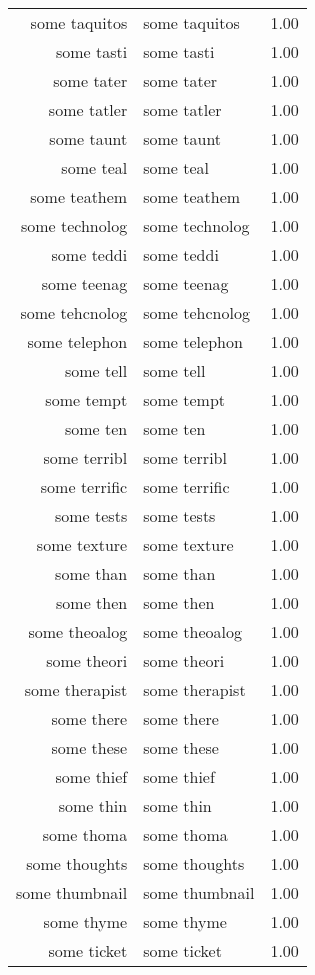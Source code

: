\begin{table}[ht]
\begin{tabular}{rlr}
  some taquitos & some taquitos & 1.00 \\ 
  some tasti & some tasti & 1.00 \\ 
  some tater & some tater & 1.00 \\ 
  some tatler & some tatler & 1.00 \\ 
  some taunt & some taunt & 1.00 \\ 
  some teal & some teal & 1.00 \\ 
  some teathem & some teathem & 1.00 \\ 
  some technolog & some technolog & 1.00 \\ 
  some teddi & some teddi & 1.00 \\ 
  some teenag & some teenag & 1.00 \\ 
  some tehcnolog & some tehcnolog & 1.00 \\ 
  some telephon & some telephon & 1.00 \\ 
  some tell & some tell & 1.00 \\ 
  some tempt & some tempt & 1.00 \\ 
  some ten & some ten & 1.00 \\ 
  some terribl & some terribl & 1.00 \\ 
  some terrific & some terrific & 1.00 \\ 
  some tests & some tests & 1.00 \\ 
  some texture & some texture & 1.00 \\ 
  some than & some than & 1.00 \\ 
  some then & some then & 1.00 \\ 
  some theoalog & some theoalog & 1.00 \\ 
  some theori & some theori & 1.00 \\ 
  some therapist & some therapist & 1.00 \\ 
  some there & some there & 1.00 \\ 
  some these & some these & 1.00 \\ 
  some thief & some thief & 1.00 \\ 
  some thin & some thin & 1.00 \\ 
  some thoma & some thoma & 1.00 \\ 
  some thoughts & some thoughts & 1.00 \\ 
  some thumbnail & some thumbnail & 1.00 \\ 
  some thyme & some thyme & 1.00 \\ 
  some ticket & some ticket & 1.00 \\ 

\end{tabular}
\end{table}
